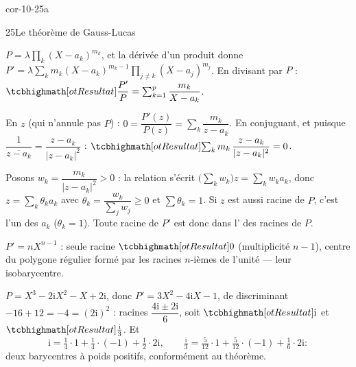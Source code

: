 
\begin{blocLivre}{cor-10-25a}
\begin{corrige}{25}{Le théorème de Gauss-Lucas}
\begin{questions}
  \item $P=\lambda\prod_k(X-a_k)^{m_k}$, et la dérivée d'un produit donne
    $P'=\lambda\sum_k m_k(X-a_k)^{m_k-1}\prod_{j\neq k}(X-a_j)^{m_j}$. En
    divisant par $P$ : $\res{\dfrac{P'}{P}=\sum_{k=1}^{p}\dfrac{m_k}{X-a_k}}$.
  \item En $z$ (qui n'annule pas $P$) :
    $0=\dfrac{P'(z)}{P(z)}=\sum_k\dfrac{m_k}{z-a_k}$. En conjuguant, et
    puisque $\dfrac{1}{\overline{z-a_k}}=\dfrac{z-a_k}{|z-a_k|^{2}}$ :
    $\res{\sum_k m_k\,\dfrac{z-a_k}{|z-a_k|^{2}}=0}$.
  \item Posons $w_k=\dfrac{m_k}{|z-a_k|^{2}}>0$ : la relation s'écrit
    $\bigl(\sum_kw_k\bigr)z=\sum_kw_ka_k$, donc $z=\sum_k\theta_ka_k$ avec
    $\theta_k=\dfrac{w_k}{\sum_jw_j}\geqslant0$ et $\sum\theta_k=1$. Si $z$
    est aussi racine de $P$, c'est l'un des $a_k$ ($\theta_k=1$). Toute
    racine de $P'$ est donc dans l' des
    racines de $P$.
\end{questions}
\begin{questions}[resume]
  \item $P'=nX^{n-1}$ : seule racine $\res{0}$ (multiplicité $n-1$),
    centre du polygone régulier formé par les racines $n$-ièmes de
    l'unité — leur isobarycentre.
  \item $P=X^{3}-2\mathrm{i}X^{2}-X+2\mathrm{i}$, donc
    $P'=3X^{2}-4\mathrm{i}X-1$, de discriminant $-16+12=-4=(2\mathrm{i})^{2}$ :
    racines $\dfrac{4\mathrm{i}\pm2\mathrm{i}}{6}$, soit $\res{\mathrm{i}}$
    et $\res{\tfrac{\mathrm{i}}{3}}$. Et
    \[
    \mathrm{i}=\tfrac14\cdot1+\tfrac14\cdot(-1)+\tfrac12\cdot2\mathrm{i},
    \qquad
    \tfrac{\mathrm{i}}{3}=\tfrac{5}{12}\cdot1+\tfrac{5}{12}\cdot(-1)
    +\tfrac16\cdot2\mathrm{i} :
    \]
    deux barycentres à poids positifs, conformément au théorème.
\end{questions}
\begin{center}
\begin{tikzpicture}[scale=1.15,line cap=round,line join=round]

\end{tikzpicture}
\end{center}
\end{corrige}
\end{blocLivre}
